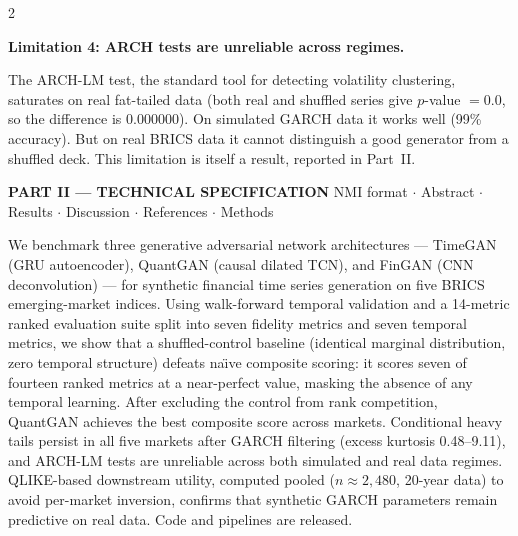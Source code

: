 \documentclass[10pt]{article}
\begin{document}
\begin{multicols}{2}
{\medskip
\textbf{Limitation 4: ARCH tests are unreliable across regimes.}

The ARCH-LM test, the standard tool for detecting volatility clustering, saturates on real fat-tailed data (both real and shuffled series give $p$-value $= 0.0$, so the difference is $0.000000$). On simulated GARCH data it works well (99\% accuracy). But on real BRICS data it cannot distinguish a good generator from a shuffled deck. This limitation is itself a result, reported in Part~II.}

\end{multicols}

\clearpage



\begin{tcolorbox}[enhanced,arc=0pt,outer arc=0pt,boxrule=0pt,
  colback=Navy!10,colframe=Navy!10,top=3pt,bottom=3pt,left=8pt,right=8pt,
  before skip=0pt,after skip=6pt]
{\large\bfseries\color{Navy} PART II --- TECHNICAL SPECIFICATION}
\hfill{\small\color{Navy!70} NMI format $\cdot$ Abstract $\cdot$ Results $\cdot$ Discussion $\cdot$ References $\cdot$ Methods}
\end{tcolorbox}

\begin{tcolorbox}[enhanced,arc=4pt,boxrule=1pt,colframe=Navy,colback=LBg,
  top=6pt,bottom=6pt,left=8pt,right=8pt,before skip=2pt,after skip=8pt,
  title={\bfseries Abstract --- $\leq$150 words, unreferenced}]
\small
We benchmark three generative adversarial network architectures --- TimeGAN (GRU autoencoder), QuantGAN (causal dilated TCN), and FinGAN (CNN deconvolution) --- for synthetic financial time series generation on five BRICS emerging-market indices. Using walk-forward temporal validation and a 14-metric ranked evaluation suite split into seven fidelity metrics and seven temporal metrics, we show that a shuffled-control baseline (identical marginal distribution, zero temporal structure) defeats na\"{\i}ve composite scoring: it scores seven of fourteen ranked metrics at a near-perfect value, masking the absence of any temporal learning. After excluding the control from rank competition, QuantGAN achieves the best composite score across markets. Conditional heavy tails persist in all five markets after GARCH filtering (excess kurtosis 0.48--9.11), and ARCH-LM tests are unreliable across both simulated and real data regimes. QLIKE-based downstream utility, computed pooled ($n\approx2{,}480$, 20-year data) to avoid per-market inversion, confirms that synthetic GARCH parameters remain predictive on real data. Code and pipelines are released.
\end{tcolorbox}
\end{document}
